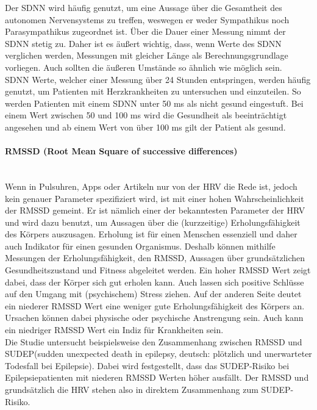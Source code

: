 Der SDNN wird häufig genutzt, um eine Aussage über die Gesamtheit des autonomen Nervensystems zu treffen, weswegen er weder Sympathikus noch Parasympathikus zugeordnet ist.\cite[S.22]{babilon}  Über die Dauer einer Messung nimmt der SDNN stetig zu. Daher ist es äußert wichtig, dass, wenn Werte des SDNN verglichen werden, Messungen mit gleicher Länge als Berechnungsgrundlage vorliegen. Auch sollten die äußeren Umstände so ähnlich wie möglich sein.\cite{zeit}\\
SDNN Werte, welcher einer Messung über 24 Stunden entspringen, werden häufig genutzt, um Patienten mit Herzkrankheiten zu untersuchen und einzuteilen. So werden Patienten mit einem SDNN unter 50 ms als nicht gesund eingestuft. Bei einem Wert zwischen 50 und 100 ms wird die Gesundheit als beeinträchtigt angesehen und ab einem Wert von über 100 ms gilt der Patient als gesund. \cite[S.4]{med}  

\paragraph{RMSSD (Root Mean Square of successive differences)}\mbox{} \\
Wenn in Pulsuhren, Apps oder Artikeln nur von der HRV die Rede ist, jedoch kein genauer Parameter spezifiziert wird, ist mit einer hohen Wahrscheinlichkeit der RMSSD gemeint. Er ist nämlich einer der bekanntesten Parameter der HRV und wird dazu benutzt, um Aussagen über die (kurzzeitige) Erholungsfähigkeit des Körpers auszusagen. Erholung ist für einen Menschen essenziell und daher auch Indikator für einen gesunden Organismus. Deshalb können mithilfe Messungen der Erholungsfähigkeit, den RMSSD, Aussagen über grundsätzlichen Gesundheitszustand und Fitness abgeleitet werden.
Ein hoher RMSSD Wert zeigt dabei, dass der Körper sich gut erholen kann. Auch lassen sich positive Schlüsse auf den Umgang mit (psychischem) Stress ziehen. 
Auf der anderen Seite deutet ein niederer RMSSD Wert eine weniger gute Erholungsfähigkeit des Körpers an. Ursachen können dabei physische oder psychische Anstrengung sein. Auch kann ein niedriger RMSSD Wert ein Indiz für Krankheiten sein.\\
 Die Studie \cite{sudep} untersucht beispielsweise den Zusammenhang zwischen RMSSD und SUDEP(sudden unexpected death in epilepsy, deutsch: plötzlich und unerwarteter Todesfall bei Epilepsie). Dabei wird festgestellt, dass das SUDEP-Risiko bei Epilepsiepatienten mit niederen RMSSD Werten höher ausfällt. Der RMSSD und grundsätzlich die HRV stehen also in direktem Zusammenhang zum SUDEP-Risiko. 

